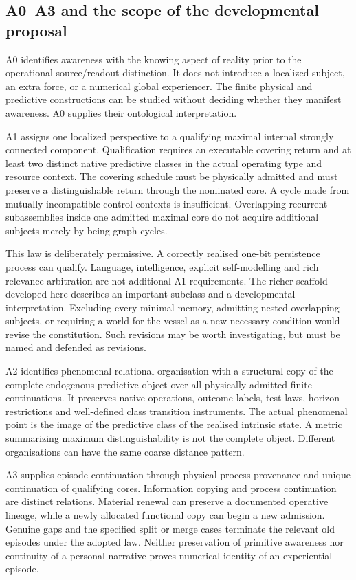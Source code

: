 \documentclass[
  11pt,
  a4paper,
]{article}
\begin{document}
\subsection{A0--A3 and the scope of the developmental
proposal}\label{a0a3-and-the-scope-of-the-developmental-proposal}

A0 identifies awareness with the knowing aspect of reality prior to the
operational source/readout distinction. It does not introduce a
localized subject, an extra force, or a numerical global experiencer.
The finite physical and predictive constructions can be studied without
deciding whether they manifest awareness. A0 supplies their ontological
interpretation.

A1 assigns one localized perspective to a qualifying maximal internal
strongly connected component. Qualification requires an executable
covering return and at least two distinct native predictive classes in
the actual operating type and resource context. The covering schedule
must be physically admitted and must preserve a distinguishable return
through the nominated core. A cycle made from mutually incompatible
control contexts is insufficient. Overlapping recurrent subassemblies
inside one admitted maximal core do not acquire additional subjects
merely by being graph cycles.

This law is deliberately permissive. A correctly realised one-bit
persistence process can qualify. Language, intelligence, explicit
self-modelling and rich relevance arbitration are not additional A1
requirements. The richer scaffold developed here describes an important
subclass and a developmental interpretation. Excluding every minimal
memory, admitting nested overlapping subjects, or requiring a
world-for-the-vessel as a new necessary condition would revise the
constitution. Such revisions may be worth investigating, but must be
named and defended as revisions.

A2 identifies phenomenal relational organisation with a structural copy
of the complete endogenous predictive object over all physically
admitted finite continuations. It preserves native operations, outcome
labels, test laws, horizon restrictions and well-defined class
transition instruments. The actual phenomenal point is the image of the
predictive class of the realised intrinsic state. A metric summarizing
maximum distinguishability is not the complete object. Different
organisations can have the same coarse distance pattern.

A3 supplies episode continuation through physical process provenance and
unique continuation of qualifying cores. Information copying and process
continuation are distinct relations. Material renewal can preserve a
documented operative lineage, while a newly allocated functional copy
can begin a new admission. Genuine gaps and the specified split or merge
cases terminate the relevant old episodes under the adopted law. Neither
preservation of primitive awareness nor continuity of a personal
narrative proves numerical identity of an experiential episode.
\end{document}
